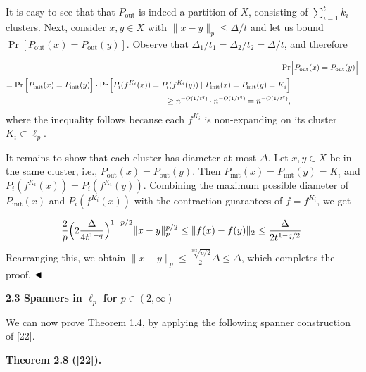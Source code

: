 \documentclass[10pt,a4paper]{amsart}
\begin{document}
\par
It is easy to see that that $P_{\text{out}}$ is indeed a partition of $X$, consisting of $\sum_{i=1}^{t}k_{i}$ clusters. Next, consider $x,y\in X$ with $\|x-y\|_{p}\leq\Delta/t$ and let us bound $\Pr[P_{\text{out}}(x)=P_{\text{out}}(y)]$. Observe that $\Delta_{1}/t_{1}=\Delta_{2}/t_{2}=\Delta/t$, and therefore
\par
\[\begin{aligned}
\displaystyle\Pr & \displaystyle\Big{[}P_{\text{out}}(x)=P_{\text{out}}(y)\Big{]} \\
\displaystyle=\Pr\Big{[}P_{\text{init}}(x)=P_{\text{init}}(y)\Big{]}\cdot\Pr%
\Big{[}P_{i}(f^{K_{i}}(x))=P_{i}(f^{K_{i}}(y))\mid P_{\text{init}}(x)=P_{\text%
{init}}(y)=K_{i}\Big{]} \\
\displaystyle\geq n^{-O\left(1/t^{q}\right)}\cdot n^{-O\left(1/t^{q}\right)}=n%
^{-O\left(1/t^{q}\right)},
\end{aligned}\]
where the inequality follows because each $f^{K_{i}}$ is non-expanding on its cluster $K_{i}\subset\ell_{p}$.
\par
\par
It remains to show that each cluster has diameter at most $\Delta$. Let $x,y\in X$ be in the same cluster, i.e., $P_{\text{out}}(x)=P_{\text{out}}(y)$. Then $P_{\text{init}}(x)=P_{\text{init}}(y)=K_{i}$ and $P_{i}(f^{K_{i}}(x))=P_{i}(f^{K_{i}}(y))$. Combining the maximum possible diameter of $P_{\text{init}}(x)$ and $P_{i}(f^{K_{i}}(x))$ with the contraction guarantees of $f=f^{K_{i}}$, we get
\par
\[\begin{aligned}
\frac{2}{p}\Big{(}2\frac{\Delta}{4t^{1-q}}\Big{)}^{1-p/2}\|x-y\|_{p}^{p/2}\leq%
\|f(x)-f(y)\|_{2}\leq\frac{\Delta}{2t^{1-q/2}}.
\end{aligned}\]
Rearranging this, we obtain $\|x-y\|_{p}\leq\frac{\sqrt[p/2]{p/2}}{2}\Delta\leq\Delta$, which completes the proof. $\hfill\blacktriangleleft$
\par
\par
\par
\par
\par\medskip\noindent\textbf{2.3 Spanners in $\ell_{p}$ for $p\in(2,\infty)$}\par
We can now prove Theorem 1.4, by applying the following spanner construction of [22].
\par
\par
\par\medskip\noindent\textbf{Theorem 2.8 ([22]).}\par
\end{document}
